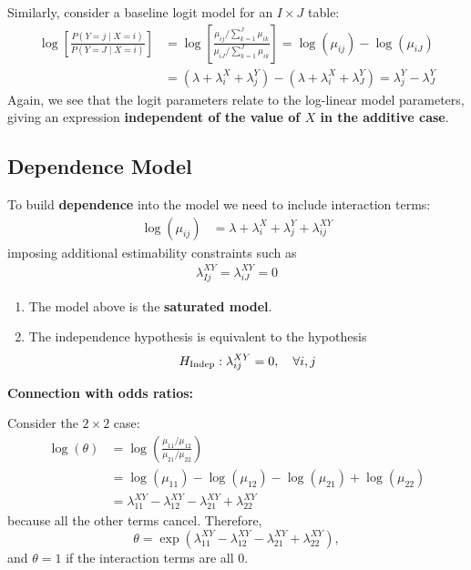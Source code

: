 \documentclass[11pt]{elegantbook}
\begin{document}
Similarly, consider a baseline logit model for an $I \times J$ table:
\begin{equation}
    \begin{aligned}
        \log \left[\frac{P(Y=j \mid X=i)}{P(Y=J \mid X=i)}\right]
        & =\log \left[\frac{\mu_{i j} /\sum_{k=1}^J\mu_{i k}}{\mu_{iJ} /\sum_{k=1}^J\mu_{ik}}\right]  =\log \left(\mu_{i j}\right)-\log \left(\mu_{i J}\right) \\
        & =\left(\lambda+\lambda_i^X+\lambda_j^Y\right)-\left(\lambda+\lambda_i^X+\lambda_J^Y\right)=\lambda_j^Y-\lambda_J^Y
    \end{aligned}
    \nonumber
\end{equation}
Again, we see that the logit parameters relate to the log-linear model parameters, giving an expression \textbf{independent of the value of $X$ in the additive case}.

\subsection{Dependence Model}
\begin{definition}
    To build \textbf{dependence} into the model we need to include interaction terms:
    \begin{equation}
        \begin{aligned}
            \log(\mu_{ij})
            &=\lambda+\lambda_i^X+\lambda_j^Y+\lambda_{ij}^{XY}
        \end{aligned}
        \nonumber
    \end{equation}
    imposing additional estimability constraints such as
    \begin{equation}
        \begin{aligned}
            \lambda_{Ij}^{XY}=\lambda_{iJ}^{XY}=0
        \end{aligned}
        \nonumber
    \end{equation}
    \begin{enumerate}[$\bullet$]
        \item The model above is the \textbf{saturated model}.
        \item The independence hypothesis is equivalent to the hypothesis $$H_{\textnormal{Indep}}:\lambda_{ij}^{XY}=0,\quad \forall i,j$$
    \end{enumerate}
\end{definition}

\textbf{Connection with odds ratios:}

Consider the $2 \times 2$ case:
$$
\begin{aligned}
\log (\theta) & =\log \left(\frac{\mu_{11} / \mu_{12}}{\mu_{21} / \mu_{22}}\right) \\
& =\log \left(\mu_{11}\right)-\log \left(\mu_{12}\right)-\log \left(\mu_{21}\right)+\log \left(\mu_{22}\right) \\
& =\lambda_{11}^{X Y}-\lambda_{12}^{X Y}-\lambda_{21}^{X Y}+\lambda_{22}^{X Y}
\end{aligned}
$$
because all the other terms cancel. Therefore,
$$
\theta=\exp \left(\lambda_{11}^{X Y}-\lambda_{12}^{X Y}-\lambda_{21}^{X Y}+\lambda_{22}^{X Y}\right),
$$
and $\theta=1$ if the interaction terms are all $0$.
\end{document}
